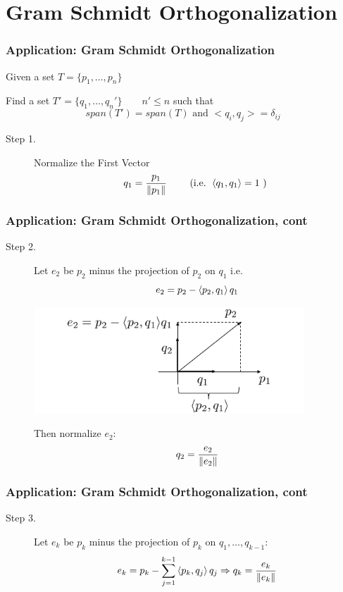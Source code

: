 \documentclass{beamer}
\begin{document}
\section{Gram Schmidt Orthogonalization}
\frame{\sectionpage}


\begin{frame}\frametitle{Application:  Gram Schmidt Orthogonalization}
\noindent Given a set $T = \{ p_1, \ldots, p_n\}$

\noindent Find a set $T' = \{q_1, \ldots, q_n'\} \qquad n' \leq n$ such that
\[ span(T') = span(T) \text{ and } <q_i,q_j> = \delta_{ij} \]

\begin{description}
\item[Step 1.]
Normalize the First Vector
\[ q_1 = \frac{p_1}{\left\| p_1 \right\|} \qquad \text{ (i.e. } \left< q_1,q_1 \right>=1 \text{ ) } \]
\end{description}
\end{frame}

\begin{frame}\frametitle{Application:  Gram Schmidt Orthogonalization, cont}

\begin{description}
\item[Step 2.]	
Let $e_2$ be $p_2$ minus the projection of $p_2$ on $q_1$
i.e.
\[ e_2 = p_2 - \left< p_2, q_1\right> q_1 \]

\begin{center}
\includegraphics[width=4in]{figures/chap2_gram_schmidt}
\end{center}

Then normalize $e_2$:
\[ q_2 = \frac{e_2}{\left\| e_2 \right\|} \]
\end{description}
\end{frame}

\begin{frame}\frametitle{Application:  Gram Schmidt Orthogonalization, cont}

\begin{description}
\item[Step 3.]
Let $e_k$ be $p_k$ minus the projection of $p_k$ on $q_1, \ldots, q_{k-1}$:
\[ e_k = p_k - \sum_{j=1}^{k-1}\left< p_k, q_j\right> q_j \Rightarrow q_k = \frac{e_k}{\left\| e_k \right\|} \]
\end{description}
\end{frame}
\end{document}
